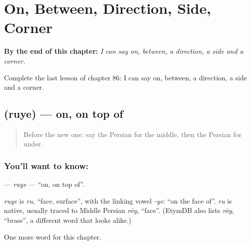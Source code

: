 
\chapter{On, Between, Direction, Side, Corner}
\label{ch:fa-on-between-direction-side-corner}

\begin{chapteropening}
\textbf{By the end of this chapter:} \emph{I can say on, between, a direction, a side and a corner.}

Complete the last lesson of chapter 86: I can say on, between, a direction, a side and a corner.
\end{chapteropening}

\section[\texorpdfstring{\fa{روی} (ruye)}{روی (ruye)}]{ (ruye) — on, on top of}

\label{lesson:FA-C86-ruye}



\begin{quote}
Before the new one: say the Persian for the middle, then the Persian for under.
\end{quote}

\subsection*{You'll want to know: }
\textbf{} — \emph{ruye} — \textquotedblleft{}on, on top of\textquotedblright{}.

\begin{cousinweb}
\emph{ruye} is \emph{ru}, \textquotedblleft{}face, surface\textquotedblright{}, with the linking vowel \emph{-ye}: \textquotedblleft{}on the face of\textquotedblright{}. \emph{ru} is native, usually traced to Middle Persian \emph{rōy}, \textquotedblleft{}face\textquotedblright{}. (EtymDB also lists \emph{rōy}, \textquotedblleft{}brass\textquotedblright{}, a different word that looks alike.)
\end{cousinweb}

\begin{grammarlens}[title={What you've built}]
One more word for this chapter.
\end{grammarlens}

